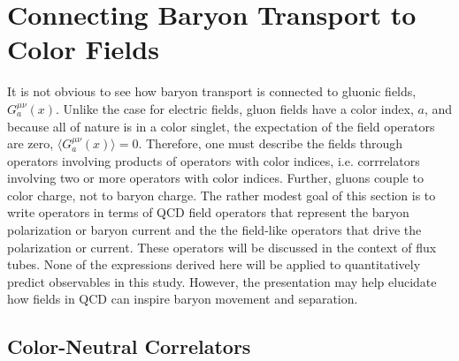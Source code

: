 \documentclass[aps, prc, 12pt, nofootinbib, showpacs, superscriptaddress, tightenlines, groupedaddress]{revtex4-2}
\begin{document}
\section{Connecting Baryon Transport to Color Fields}\label{sec:kubo}

It is not obvious to see how baryon transport is connected to gluonic fields, $G^{\mu\nu}_a(x)$. Unlike the case for electric fields, gluon fields have a color index, $a$, and because all of nature is in a color singlet, the expectation of the field operators are zero, $\langle G^{\mu\nu}_a(x)\rangle=0$. Therefore, one must describe the fields through operators involving products of operators with color indices, i.e. corrrelators involving two or more operators with color indices. Further, gluons couple to color charge, not to baryon charge. The rather modest goal of this section is to write operators in terms of QCD field operators that represent the baryon polarization or baryon current and the the field-like operators that drive the polarization or current. These operators will be discussed in the context of flux tubes. None of the expressions derived here will be applied to quantitatively predict observables in this study. However, the presentation may help elucidate how fields in QCD can inspire baryon movement and separation.

\subsection{Color-Neutral Correlators}
\end{document}
